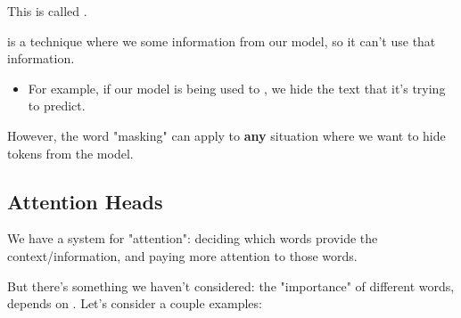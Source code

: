     This is called .\\

    \begin{definition}
         is a technique where we  some information from our model, so it can't use that information.

        \begin{itemize}
            \item For example, if our model is being used to , we hide the text that it's trying to predict.
        \end{itemize}

        However, the word "masking" can apply to \textbf{any} situation where we want to hide tokens from the model.
    \end{definition}
    
\pagebreak

\subsection{Attention Heads}

    We have a system for "attention": deciding which words provide the  context/information, and paying more attention to those words.

    But there's something we haven't considered: the "importance" of different words, depends on . Let's consider a couple examples:

